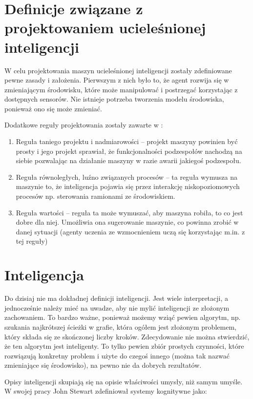 \section{Definicje związane z projektowaniem ucieleśnionej inteligencji}

W celu projektowania maszyn ucieleśnionej inteligencji zostały zdefiniowane 
pewne zasady i założenia. Pierwszym z nich było to, że agent rozwija się w 
zmieniającym środowisku, które może manipulować i postrzegać korzystając z 
dostępnych sensorów. Nie istnieje potrzeba tworzenia modelu środowiska, 
ponieważ ono się może zmieniać. 

Dodatkowe reguły projektowania zostały zawarte w \cite{pfeifer_ei}:
\begin{enumerate}
	\item Reguła taniego projektu i nadmiarowości -- projekt maszyny powinien 
	być prosty i jego projekt sprawiał, że funkcjonalności podzespołów nachodzą 
	na siebie pozwalając na działanie maszyny w razie awarii jakiegoś 
	podzespołu.
	\item Reguła równoległych, luźno związanych procesów -- ta reguła wymusza 
	na maszynie to, że inteligencja pojawia się przez interakcję 
	niskopoziomowych procesów np. sterowania ramionami ze środowiskiem.
	\item Reguła wartości -- reguła ta może wymuszać, aby maszyna robiła, to co 
	jest dobre dla niej. Umożliwia ona sugerowanie maszynie, co powinna zrobić 
	w danej sytuacji (agenty uczenia ze wzmocnieniem uczą się korzystając m.in. 
	z tej reguły)
\end{enumerate}
		
\section{Inteligencja}
Do dzisiaj nie ma dokładnej definicji inteligencji. Jest wiele interpretacji, a 
jednocześnie należy mieć na uwadze, aby nie mylić inteligencji ze złożonym 
zachowaniem. To bardzo ważne, ponieważ możemy wziąć pewien algorytm, np. 
szukania najkrótszej ścieżki w grafie, która ogółem jest złożonym problemem, 
który składa się ze skończonej liczby kroków. Zdecydowanie nie można 
stwierdzić, że ten algorytm jest inteligenty. To tylko pewien zbiór prostych 
czynności, które rozwiązują konkretny problem i użyte do czegoś innego (można 
tak nazwać zmieniające się środowisko), na pewno nie da dobrych rezultatów.

Opisy inteligencji skupiają się na opisie właściwości umysły, niż samym umyśle. 
W swojej pracy \cite{stewart_93} John Stewart zdefiniował systemy kognitywne 
jako:

